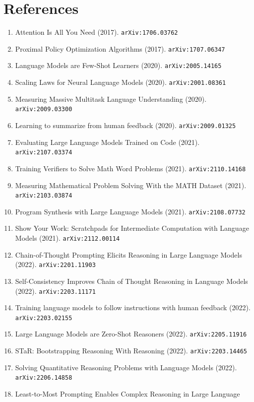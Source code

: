 \documentclass[11pt]{article}
\begin{document}
\section*{References}
\begin{enumerate}\small
  \item Attention Is All You Need (2017). \texttt{arXiv:1706.03762}
  \item Proximal Policy Optimization Algorithms (2017). \texttt{arXiv:1707.06347}
  \item Language Models are Few-Shot Learners (2020). \texttt{arXiv:2005.14165}
  \item Scaling Laws for Neural Language Models (2020). \texttt{arXiv:2001.08361}
  \item Measuring Massive Multitask Language Understanding (2020). \texttt{arXiv:2009.03300}
  \item Learning to summarize from human feedback (2020). \texttt{arXiv:2009.01325}
  \item Evaluating Large Language Models Trained on Code (2021). \texttt{arXiv:2107.03374}
  \item Training Verifiers to Solve Math Word Problems (2021). \texttt{arXiv:2110.14168}
  \item Measuring Mathematical Problem Solving With the MATH Dataset (2021). \texttt{arXiv:2103.03874}
  \item Program Synthesis with Large Language Models (2021). \texttt{arXiv:2108.07732}
  \item Show Your Work: Scratchpads for Intermediate Computation with Language
  Models (2021). \texttt{arXiv:2112.00114}
  \item Chain-of-Thought Prompting Elicits Reasoning in Large Language Models (2022). \texttt{arXiv:2201.11903}
  \item Self-Consistency Improves Chain of Thought Reasoning in Language Models (2022). \texttt{arXiv:2203.11171}
  \item Training language models to follow instructions with human feedback (2022). \texttt{arXiv:2203.02155}
  \item Large Language Models are Zero-Shot Reasoners (2022). \texttt{arXiv:2205.11916}
  \item STaR: Bootstrapping Reasoning With Reasoning (2022). \texttt{arXiv:2203.14465}
  \item Solving Quantitative Reasoning Problems with Language Models (2022). \texttt{arXiv:2206.14858}
  \item Least-to-Most Prompting Enables Complex Reasoning in Large Language

\end{enumerate}
\end{document}
